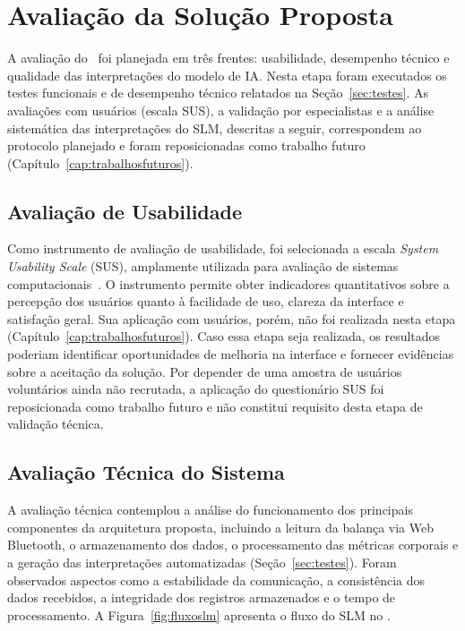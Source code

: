 \section{Avaliação da Solução Proposta}

A avaliação do \sintonia\ foi planejada em três frentes: usabilidade, desempenho técnico e
qualidade das interpretações do modelo de IA. Nesta etapa foram executados os testes
funcionais e de desempenho técnico relatados na Seção~\ref{sec:testes}. As avaliações com
usuários (escala SUS), a validação por especialistas e a análise sistemática das
interpretações do SLM, descritas a seguir, correspondem ao protocolo planejado e foram
reposicionadas como trabalho futuro (Capítulo~\ref{cap:trabalhosfuturos}).

\subsection{Avaliação de Usabilidade}

Como instrumento de avaliação de usabilidade, foi selecionada a escala \emph{System
Usability Scale} (SUS), amplamente utilizada para avaliação de sistemas
computacionais~\cite{brooke1996}. O instrumento permite obter indicadores quantitativos
sobre a percepção dos usuários quanto à facilidade de uso, clareza da interface e
satisfação geral. Sua aplicação com usuários, porém, não foi realizada nesta etapa
(Capítulo~\ref{cap:trabalhosfuturos}). Caso essa etapa seja realizada, os resultados
poderiam identificar oportunidades de melhoria na interface e fornecer evidências sobre a
aceitação da solução. Por depender de uma amostra de usuários voluntários ainda não
recrutada, a aplicação do questionário SUS foi reposicionada como trabalho futuro e não
constitui requisito desta etapa de validação técnica.

\subsection{Avaliação Técnica do Sistema}

A avaliação técnica contemplou a análise do funcionamento dos principais componentes da
arquitetura proposta, incluindo a leitura da balança via Web Bluetooth, o armazenamento dos
dados, o processamento das métricas corporais e a geração das interpretações automatizadas
(Seção~\ref{sec:testes}). Foram observados aspectos como a estabilidade da comunicação, a
consistência dos dados recebidos, a integridade dos registros armazenados e o tempo de
processamento. A Figura~\ref{fig:fluxoslm} apresenta o fluxo do SLM no \sintonia.

